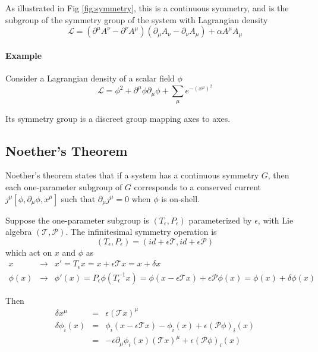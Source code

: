 \documentclass[12pt]{book}
\begin{document}
	As illustrated in Fig \ref{fig:symmetry}, this is a continuous symmetry, and is the subgroup of the symmetry group of the system with Lagrangian density	
	\begin{equation}
		\mathcal{L}=(\partial^\mu A^\nu-\partial^\nu A^\mu)(\partial_\mu A_\nu-\partial_\nu A_\mu)+\alpha A^\mu A_\mu
	\end{equation}	
	
	\paragraph{Example} Consider a Lagrangian density of a scalar field $\phi$
	\begin{equation}
		\mathcal{L}=\phi^2+\partial^\mu \phi \partial_\mu\phi+ \sum_{\mu}e^{-(x^\mu)^2}
	\end{equation}	
	
	Its symmetry group is a discreet group mapping axes to axes. 
	\subsection{Noether's Theorem}
	
	Noether's theorem states that if a system has a continuous symmetry $G$, then each one-parameter subgroup of $G$ corresponds to a conserved current $j^\mu[\phi,\partial_\mu\phi,x^\mu]$ such that $\partial_\mu j^\mu=0$ when $\phi$ is on-shell.
	
	Suppose the one-parameter subgroup is $(T_\epsilon,P_\epsilon)$ parameterized by $\epsilon$, with Lie algebra $(\mathcal T,\mathcal P)$. The infinitesimal symmetry operation is
	\begin{equation}
		(T_\epsilon,P_\epsilon)=(id+\epsilon\mathcal T,id+\epsilon\mathcal P)
	\end{equation}
	which act on $x$ and $\phi$ as
	\begin{eqnarray}
		x&\longrightarrow&x'=T_\epsilon x=x+\epsilon\mathcal Tx=x+\delta x\\
		\phi(x)&\longrightarrow&\phi'(x)=P_\epsilon\phi(T_\epsilon^{-1}x)=\phi(x-\epsilon\mathcal Tx)+\epsilon\mathcal P\phi(x)=\phi(x)+\delta\phi(x)
	\end{eqnarray}
	
	Then
	\begin{eqnarray}
		\delta x^\mu&=&\epsilon(\mathcal Tx)^\mu \label{eqn:dx}\\
		\delta\phi_i(x)&=&\phi_i(x-\epsilon\mathcal Tx)-\phi_i(x)+\epsilon(\mathcal P\phi)_i(x)\\
		&=&-\epsilon\partial_\mu\phi_i(x)(\mathcal Tx)^\mu+\epsilon(\mathcal P\phi)_i(x) \label{eqn:dphi}
	\end{eqnarray}
	
\end{document}
